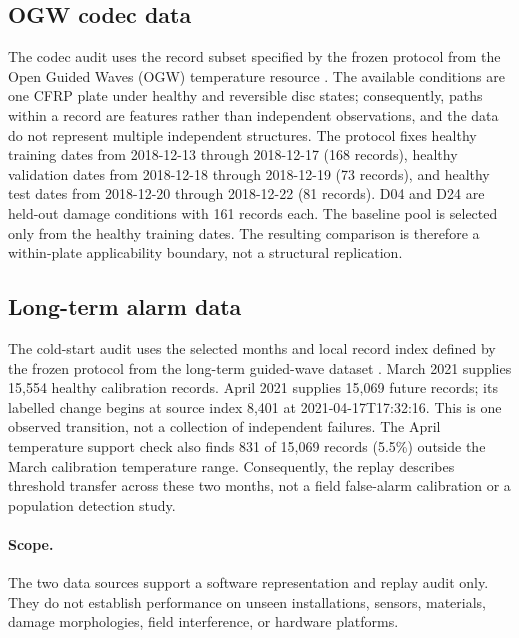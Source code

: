 \subsection{OGW codec data}
The codec audit uses the record subset specified by the frozen protocol from
the Open Guided Waves (OGW) temperature resource \cite{moll2019ogw}. The
available conditions are one CFRP plate under healthy and reversible disc
states; consequently, paths within a record are features rather than
independent observations, and the data do not represent multiple independent
structures. The protocol fixes healthy training dates from 2018-12-13 through
2018-12-17 (168 records), healthy validation dates from 2018-12-18 through
2018-12-19 (73 records), and healthy test dates from 2018-12-20 through
2018-12-22 (81 records). D04 and D24 are held-out damage conditions with 161
records each. The baseline pool is selected only from the healthy training
dates. The resulting comparison is therefore a within-plate applicability
boundary, not a structural replication.

\subsection{Long-term alarm data}
The cold-start audit uses the selected months and local record index defined
by the frozen protocol from the long-term guided-wave dataset
\cite{yang2025dataset}. March 2021 supplies 15,554 healthy calibration
records. April 2021 supplies 15,069 future records; its labelled change
begins at source index 8,401 at 2021-04-17T17:32:16. This is one observed
transition, not a collection of independent failures. The April temperature
support check also finds 831 of 15,069 records (5.5\%) outside the March
calibration temperature range. Consequently, the replay describes threshold
transfer across these two months, not a field false-alarm calibration or a
population detection study.

\paragraph{Scope.}
The two data sources support a software representation and replay audit only.
They do not establish performance on unseen installations, sensors,
materials, damage morphologies, field interference, or hardware platforms.
